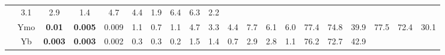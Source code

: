 \documentclass[french,10pt]{article}
\begin{document}
\begin{landscape}
\begin{longtable}{ l c | c c c | c c c | c c c | c c c | c c c | c c c | }
    & 3.1
    & {\footnotesize                         2.9
    } & {\footnotesize                         1.4
    }


    & 4.7
    & {\footnotesize                         4.4
    } & {\footnotesize                         1.9
    }


    & 6.4
    & {\footnotesize                         6.3
    } & {\footnotesize                         2.2
    }
    
    
                    \\*
    & {\small Ymo  }

    &                                         \textbf{ 0.01}
    & {\footnotesize                         \textbf{ 0.005}
    } & {\footnotesize                         0.009
    }


    & 1.1
    & {\footnotesize                         0.7
    } & {\footnotesize                         1.1
    }


    & 4.7
    & {\footnotesize                         3.3
    } & {\footnotesize                         4.4
    }


    & 7.7
    & {\footnotesize                         6.1
    } & {\footnotesize                         6.0
    }


    & 77.4
    & {\footnotesize                         74.8
    } & {\footnotesize                         39.9
    }


    & 77.5
    & {\footnotesize                         72.4
    } & {\footnotesize                         30.1
    }
    
    
                    \\*
                        & {\small Yb  }

    &                                         \textbf{ 0.003}
    & {\footnotesize                         \textbf{ 0.003}
    } & {\footnotesize                         0.002
    }


    & 0.3
    & {\footnotesize                         0.3
    } & {\footnotesize                         0.2
    }


    & 1.5
    & {\footnotesize                         1.4
    } & {\footnotesize                         0.7
    }


    & 2.9
    & {\footnotesize                         2.8
    } & {\footnotesize                         1.1
    }


    & 76.2
    & {\footnotesize                         72.7
    } & {\footnotesize                         42.9
    }



\end{longtable}
\end{landscape}
\end{document}
